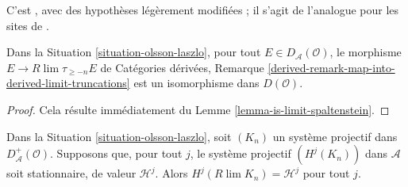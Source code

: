 \begin{lemma}
\label{lemma-olsson-laszlo}
\begin{reference}
C'est \cite[Proposition 2.1.4]{six-I}, avec des hypothèses légèrement
modifiées ; il s'agit de l'analogue pour les sites de
\cite[Proposition 3.13]{Spaltenstein}.
\end{reference}
Dans la Situation \ref{situation-olsson-laszlo}, pour tout
$E \in D_\mathcal{A}(\mathcal{O})$, le morphisme
$E \to R\lim \tau_{\geq -n} E$
de Catégories dérivées, Remarque
\ref{derived-remark-map-into-derived-limit-truncations}
est un isomorphisme dans $D(\mathcal{O})$.
\end{lemma}

\begin{proof}
Cela résulte immédiatement du Lemme \ref{lemma-is-limit-spaltenstein}.
\end{proof}

\begin{lemma}
\label{lemma-olsson-laszlo-modified}
Dans la Situation \ref{situation-olsson-laszlo}, soit $(K_n)$ un système
projectif dans $D_\mathcal{A}^+(\mathcal{O})$. Supposons que, pour tout
$j$, le système projectif $(H^j(K_n))$ dans $\mathcal{A}$ soit
stationnaire, de valeur $\mathcal{H}^j$. Alors
$H^j(R\lim K_n) = \mathcal{H}^j$ pour tout $j$.
\end{lemma}

